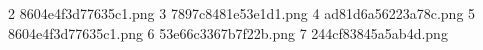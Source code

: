 2 8604e4f3d77635c1.png
3 7897c8481e53e1d1.png
4 ad81d6a56223a78c.png
5 8604e4f3d77635c1.png
6 53e66c3367b7f22b.png
7 244cf83845a5ab4d.png
